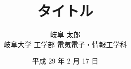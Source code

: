 \begin{titlepage}
  \title{
    タイトル
  }
  \author{
    岐阜 太郎 \\
    {\small 岐阜大学 工学部 電気電子・情報工学科}
  }
  \date{平成 29 年 2 月 17 日}
\end{titlepage}
